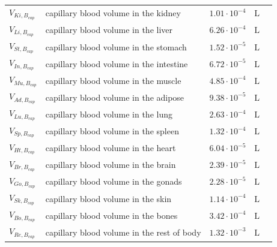 \documentclass[preprint,12pt,authoryear]{elsarticle}
\begin{document}
\begin{longtable}{P{2cm}P{3.5cm}P{2cm}P{1cm}P{2.5cm}}
$V_{Ki,B_{cap}}$ & capillary blood volume in the kidney & $1.01 \cdot 10^{-4}$ & $\text{L}$ & \citep{bernareggi_1991} \\
$V_{Li,B_{cap}}$ & capillary blood volume in the liver  & $6.26 \cdot 10^{-4}$ & $\text{L}$ & \citep{bernareggi_1991} \\
$V_{St,B_{cap}}$ & capillary blood volume in the stomach & $1.52 \cdot 10^{-5}$ & $\text{L}$ & \citep{bernareggi_1991} \\
$V_{In,B_{cap}}$ & capillary blood volume in the intestine & $6.72 \cdot 10^{-5}$ & $\text{L}$ & \citep{bernareggi_1991} \\
$V_{Mu,B_{cap}}$ & capillary blood volume in the muscle & $4.85 \cdot 10^{-4}$ & $\text{L}$ & \citep{bernareggi_1991} \\
$V_{Ad,B_{cap}}$ & capillary blood volume in the adipose & $9.38 \cdot 10^{-5}$ & $\text{L}$ & \citep{bernareggi_1991} \\
$V_{Lu,B_{cap}}$ & capillary blood volume in the lung & $2.63 \cdot 10^{-4}$ & $\text{L}$ & \citep{bernareggi_1991} \\
$V_{Sp,B_{cap}}$ & capillary blood volume in the spleen & $1.32 \cdot 10^{-4}$ & $\text{L}$ & \citep{bernareggi_1991} \\
$V_{Ht,B_{cap}}$ & capillary blood volume in the heart & $6.04 \cdot 10^{-5}$ & $\text{L}$ & \citep{bernareggi_1991} \\
$V_{Br,B_{cap}}$ & capillary blood volume in the brain & $2.39 \cdot 10^{-5}$ & $\text{L}$ & \citep{bernareggi_1991} \\
$V_{Go,B_{cap}}$ & capillary blood volume in the gonads & $2.28 \cdot 10^{-5}$ & $\text{L}$ & \citep{bernareggi_1991} \\
$V_{Sk,B_{cap}}$ & capillary blood volume in the skin & $1.14 \cdot 10^{-4}$ & $\text{L}$ & \citep{bernareggi_1991} \\
$V_{Bo,B_{cap}}$ & capillary blood volume in the bones & $3.42 \cdot 10^{-4}$ & $\text{L}$ & \citep{bernareggi_1991} \\
$V_{Re,B_{cap}}$ & capillary blood volume in the rest of body & $1.32 \cdot 10^{-3}$ & $\text{L}$ & \citep{bernareggi_1991} \\
\midrule\midrule


\end{longtable}
\end{document}

